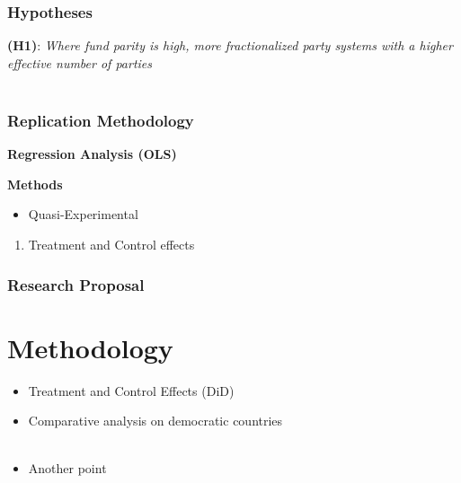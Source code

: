 \documentclass{beamer}
\begin{document}

\begin{frame}
  \frametitle{Hypotheses}
  \begin{block}{}
   		 \textbf{(H1)}: \emph{Where fund parity is high, more fractionalized party systems with a higher effective number of parties}\\~\
\end{block}
\end{frame}


\begin{frame}
\frametitle{Replication Methodology}
\textbf{Regression Analysis (OLS)} 
\begin{itemize}
	\item{%
	\end{itemize}
\textbf{Methods} 
\begin{itemize}
	\item{Quasi-Experimental} 
	\end{itemize}
		\begin{enumerate}[i]
		\item{{Treatment and Control effects}}
\end{enumerate}
\end{frame}


\begin{frame}
\frametitle{Research Proposal} 
\section{Methodology}
\begin{itemize}
	\item {Treatment and Control Effects (DiD)}
\end{itemize}
\begin{itemize} 
	\item{Comparative analysis on democratic countries}\\~\
	\item{Another point}\\~\
\end{itemize}
\end{frame}


\setlength{\tabcolsep}{20 pt}
\renewcommand{\arraystretch}{1.5}
\end{document}
